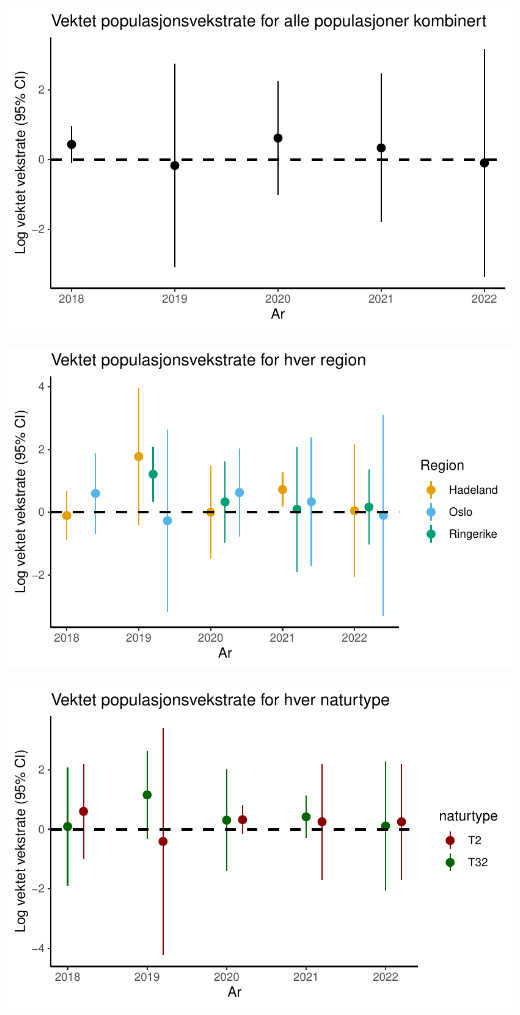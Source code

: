 \documentclass[
  letterpaper,
  DIV=11,
  numbers=noendperiod]{scrreport}
\begin{document}
\includegraphics{growthRate_meta_files/figure-pdf/unnamed-chunk-4-1.pdf}

\includegraphics{growthRate_meta_files/figure-pdf/unnamed-chunk-5-1.pdf}

\includegraphics{growthRate_meta_files/figure-pdf/unnamed-chunk-6-1.pdf}
\end{document}
